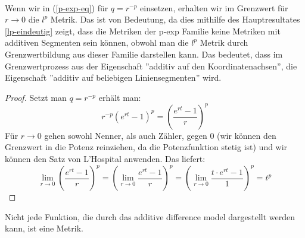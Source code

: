   \begin{rem}~\\
    Wenn wir in (\ref{p-exp-eq}) für $q = r^{-p}$ einsetzen, erhalten wir im Grenzwert für $r  \rightarrow 0$ die $l^p$ Metrik.
    Das ist von Bedeutung, da dies mithilfe des Hauptresultates \ref{lp-eindeutig} zeigt, dass die Metriken der p-exp Familie keine Metriken mit additiven Segmenten sein können, obwohl man die $l^p$ Metrik durch Grenzwertbildung aus dieser Familie darstellen kann.
    Das bedeutet, dass im Grenzwertprozess aus der Eigenschaft ''additiv auf den Koordinatenachsen'', die Eigenschaft ''additiv auf beliebigen Liniensegmenten'' wird.

    \begin{proof}
      Setzt man $q = r^{-p}$ erhält man:
      $$ r^{-p}(e^{rt} - 1)^p = \left( \frac{e^{rt} -1}{r} \right)^p $$
      Für $r \rightarrow 0$ gehen sowohl Nenner, als auch Zähler, gegen $0$ (wir können den Grenzwert in die Potenz reinziehen, da die Potenzfunktion stetig ist) und wir können den Satz von L'Hospital anwenden.
      Das liefert:
      $$ 
      \lim_{r \rightarrow 0} \left( \frac{e^{rt} -1}{r} \right)^p = \left( \lim_{r \rightarrow 0} \frac{e^{rt} -1}{r} \right)^p = \left( \lim_{r \rightarrow 0} \frac{t \cdot e^{rt} - 1}{1} \right)^p = t^p
      $$
    \end{proof}
  
  \end{rem}

Nicht jede Funktion, die durch das additive difference model dargestellt werden kann, ist eine Metrik.

